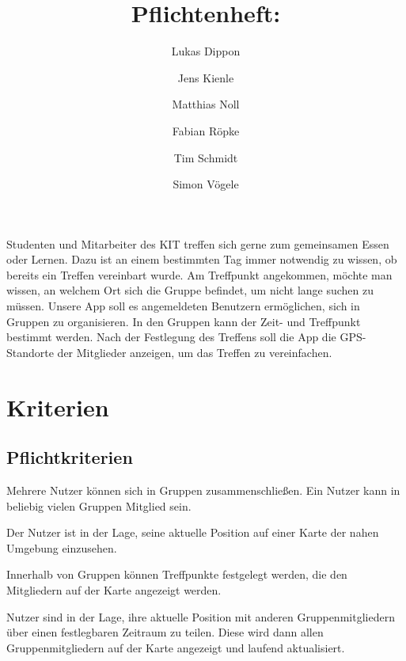 \documentclass[parskip=full,11pt]{scrartcl}
\title{Pflichtenheft: \producttitle}
\author{Lukas Dippon
        \and Jens Kienle
        \and Matthias Noll
        \and Fabian Röpke
        \and Tim Schmidt
        \and Simon Vögele}
\begin{document}
\maketitle
\thispagestyle{empty} %

\section*{} %
Studenten und Mitarbeiter des KIT treffen sich gerne zum gemeinsamen Essen oder Lernen.
Dazu ist an einem bestimmten Tag immer notwendig zu wissen, ob bereits ein Treffen vereinbart wurde.
Am Treffpunkt angekommen, möchte man wissen, an welchem Ort sich die Gruppe befindet, um nicht lange suchen zu müssen.
Unsere App soll es angemeldeten Benutzern ermöglichen, sich in Gruppen zu organisieren.
In den Gruppen kann der Zeit- und Treffpunkt bestimmt werden.
Nach der Festlegung des Treffens soll die App die GPS-Standorte der Mitglieder anzeigen, um das Treffen zu vereinfachen.

\pagebreak
\tableofcontents

\pagebreak
\section{Kriterien}

\subsection{Pflichtkriterien}
Mehrere Nutzer können sich in Gruppen zusammenschließen.
Ein Nutzer kann in beliebig vielen Gruppen Mitglied sein.

Der Nutzer ist in der Lage, seine aktuelle Position auf einer Karte der nahen
Umgebung einzusehen.

Innerhalb von Gruppen können Treffpunkte festgelegt werden,
die den Mitgliedern auf der Karte angezeigt werden.

Nutzer sind in der Lage, ihre aktuelle Position mit anderen Gruppenmitgliedern
über einen festlegbaren Zeitraum zu teilen.
Diese wird dann allen Gruppenmitgliedern auf der Karte angezeigt und laufend
aktualisiert.
\end{document}
